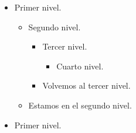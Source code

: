 \documentclass[a4paper,12pt]{article}
\begin{document}
\begin{itemize}
    \item Primer nivel.
        \begin{itemize}
            \item Segundo nivel.
                \begin{itemize}
                    \item Tercer nivel.
                        \begin{itemize}
                            \item Cuarto nivel.
                        \end{itemize}
                    \item Volvemos al tercer nivel.
                \end{itemize}
            \item Estamos en el segundo nivel.
        \end{itemize}
    \item Primer nivel.
 \end{itemize}
 
\end{document}
